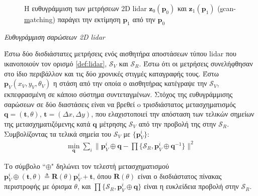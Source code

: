 \begin{figure}[htbp]\centering\vspace{1cm}
  
  \vspace{0.5cm}
  \caption{\small Η ευθυγράμμιση των μετρήσεων 2D lidar $\bm{z}_0(\bm{p}_0)$ και
           $\bm{z}_1(\bm{p}_1)$ (\underline{s}can-\underline{m}atching)
           παράγει την εκτίμηση $\bm{p}_1$ από την $\bm{p}_0$}
  \label{fig:sm_principle}
\end{figure}

\begin{bw_box}
\begin{definition}
\label{def:sm}
\textit{Ευθυγράμμιση σαρώσεων 2D lidar}

Έστω δύο δισδιάστατες μετρήσεις ενός αισθητήρα αποστάσεων τύπου lidar που
ικανοποιούν τον ορισμό \ref{def:lidar}, $\mathcal{S}_V$ και $\mathcal{S}_R$.
Έστω ότι οι μετρήσεις συνελήφθησαν στο ίδιο περιβάλλον και τις δύο χρονικές
στιγμές καταγραφής τους. Έστω $\bm{p}_V(x_V,y_V,\theta_V)$ η στάση από την
οποία ο αισθητήρας κατέγραψε την $\mathcal{S}_V$, εκπεφρασμένη σε κάποιο
σύστημα συντεταγμένων.  Στόχος της ευθυγράμμισης σαρώσεων σε δύο διαστάσεις
είναι να βρεθεί o τρισδιάστατος μετασχηματισμός $\bm{q} = (\bm{t}, \theta)$,
$\bm{t} = (\Delta x, \Delta y)$, που ελαχιστοποιεί την απόσταση των τελικών
σημείων της μετασχηματιζόμενης κατά $\bm{q}$ μέτρησης $\mathcal{S}_V$ από την
προβολή της στην $\mathcal{S}_R$.  Συμβολίζοντας τα τελικά σημεία του
$\mathcal{S}_V$ με $\{\bm{p}_V^i\}$:
\begin{align}
  \underset{\bm{q}}{\min} \sum\limits_i \Big\| \bm{p}_V^i \oplus \bm{q} - \prod \{ \mathcal{S}_R, \bm{p}_V^i \oplus \bm{q}^{-1} \}\Big\|^2
  \label{eq:sm_def}
\end{align}

Το σύμβολο ``$\oplus$" δηλώνει τον τελεστή μετασχηματισμού $\bm{p}_V^i \oplus
(\bm{t}, \theta) \triangleq \bm{R}(\theta) \bm{p}^i_V + \bm{t}$, όπου
$\bm{R}(\theta)$ είναι ο δισδιάστατος πίνακας περιστροφής με όρισμα
$\theta$, και $\prod\{\mathcal{S}_R, \bm{p}_V^i \oplus \bm{q} \}$ είναι η
ευκλείδεια προβολή στην $\mathcal{S}_R$.
\end{definition}
\end{bw_box}




